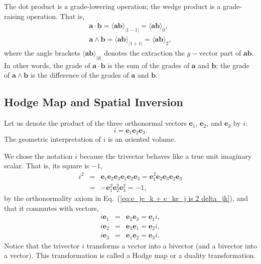 \documentclass[11pt,twocolumn]{article}
\begin{document}
The dot product is a grade-lowering operation; the wedge product is a grade-raising operation.  That is,
\begin{eqnarray}
\label{eq:a dot b is ab_1-1 component}
\mathbf a\cdot\mathbf b =\langle\mathbf a\mathbf b\rangle_{|1-1|}=\langle\mathbf a\mathbf b\rangle_0,\\
\label{eq:a wedge b is ab_1+1 component}
\mathbf a\wedge\mathbf b =\langle\mathbf a\mathbf b\rangle_{|1+1|}=\langle\mathbf a\mathbf b\rangle_2,
\end{eqnarray}
where the angle brackets $\langle\mathbf a\mathbf b \rangle_{|g|}$ denotes the extraction the $g-$vector part of $\mathbf a\mathbf b$.  In other words, the grade of $\mathbf a\cdot\mathbf b$ is the sum of the grades of $\mathbf a$ and $\mathbf b$; the grade of $\mathbf a\wedge\mathbf b$ is the difference of the grades of $\mathbf a$ and $\mathbf b$.

\subsection{Hodge Map and Spatial Inversion}  

Let us denote the product of the three orthonormal vectors $\mathbf e_1$, $\mathbf e_2$, and $\mathbf e_3$ by $i$:\cite{BaylisHuschiltWei_1992_ajpv60i9pp788-797_p790}
\begin{equation}
\label{eq:i = e_1e_2e_3}
i=\mathbf e_1\mathbf e_2\mathbf e_3.
\end{equation}
The geometric interpretation of $i$ is an oriented volume.

We chose the notation $i$ because the trivector behaves like a true unit imaginary scalar.  That is, its square is $-1$,
\begin{eqnarray}
\label{eq:i^2 = -1}
i^2&=&\mathbf e_1\mathbf e_2\mathbf e_3\mathbf e_1\mathbf e_2\mathbf e_3=\mathbf e_1^2\mathbf e_2\mathbf e_3\mathbf e_2\mathbf e_3\nonumber\\
&=&-\mathbf e_1^2\mathbf e_2^2\mathbf e_3^2=-1,
\end{eqnarray}
by the orthonormality axiom in Eq.~(\ref{eq:e_je_k + e_ke_j is 2 delta_jk}), and that it commutes with vectors,
\begin{eqnarray}
\label{eq:ie_1 is e_2e_3 is e_1i}
i\mathbf e_1 &=& \mathbf e_2\mathbf e_3 = \mathbf e_1i,\\
\label{eq:ie_2 is e_3e_1 is e_2i}
i\mathbf e_2 &=& \mathbf e_3\mathbf e_1 = \mathbf e_2i,\\
\label{eq:ie_3 is e_1e_2 is e_3i}
i\mathbf e_3 &=& \mathbf e_1\mathbf e_2 = \mathbf e_3i.
\end{eqnarray}
Notice that the trivector $i$ transforms a vector into a bivector (and a bivector into a vector).  This transformation is called a Hodge map or a duality transformation.
\end{document}
